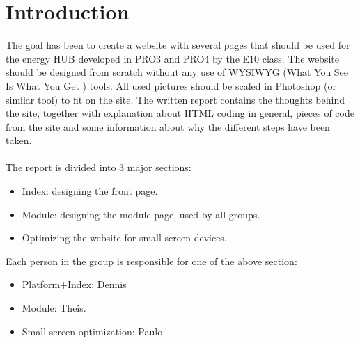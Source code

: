 \chapter{Introduction}
The goal has been to create a website with several pages that should be used for the energy HUB developed in PRO3 and PRO4 by the E10 class. The website should be designed from scratch without any use of WYSIWYG (What You See Is What You Get ) tools. All used pictures should be scaled in Photoshop (or similar tool) to fit on the site. The written report contains the thoughts behind the site, together with explanation about HTML coding in general, pieces of code from the site and some information about why the different steps have been taken. \\
\\
The report is divided into 3 major sections:
\begin{itemize}
	\item Index: designing the front page.
	\item Module: designing the module page, used by all groups.
	\item Optimizing the website for small screen devices.
\end{itemize}
Each person in the group is responsible for one of the above section:
\begin{itemize}
	\item Platform+Index: Dennis
	\item Module: Theis.
	\item Small screen optimization: Paulo
\end{itemize}
